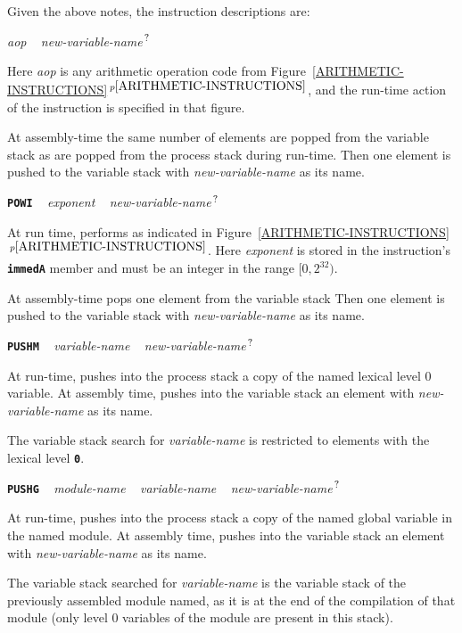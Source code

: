\documentclass[12pt]{article}
\makeatletter
\newcommand{\TT}[1]{{\tt \bfseries #1}}
\newcommand{\QMARK}{{$^{\,\mbox{\footnotesize ?}}$}}
\newcommand{\ttkey}[1]{\TT{#1}\index{#1@{\tt #1}}}
\newcommand{\itemref}[1]{\ref{#1}$\,^{p\pageref{#1}}$}
\newenvironment{indpar}[1][0.3in]%
	{\begin{list}{}%
		     {\setlength{\itemsep}{0in}%
		      \setlength{\topsep}{0in}%
		      \setlength{\parsep}{1ex}%
		      \setlength{\labelwidth}{#1}%
		      \setlength{\leftmargin}{#1}%
		      \addtolength{\leftmargin}{\labelsep}}%
	 \item}%
	{\end{list}}
\makeatother
\begin{document}

Given the above notes, the instruction descriptions are:

{\em aop} ~ {\em new-variable-name}\QMARK{}
\begin{indpar}
Here {\em aop} is any arithmetic operation code from
Figure~\itemref{ARITHMETIC-INSTRUCTIONS}, and the run-time
action of the instruction is specified in that figure.

At assembly-time the same number of elements are popped from the variable stack
as are popped from the process stack during run-time.
Then one element is pushed to the variable stack with
{\em new-variable-name} as its name.
\end{indpar}

\ttkey{POWI} ~ {\em exponent} ~
              {\em new-variable-name}\QMARK{}
\begin{indpar}
At run time, performs as indicated in
Figure~\itemref{ARITHMETIC-INSTRUCTIONS}.
Here {\em exponent} is stored in the instruction's \TT{immedA}
member and must be an integer in the range $[0,2^{32})$.

At assembly-time pops one element from the variable stack
Then one element is pushed to the variable stack with
{\em new-variable-name} as its name.
\end{indpar}

\ttkey{PUSHM} ~ {\em variable-name} ~
              {\em new-variable-name}\QMARK{}
\begin{indpar}
At run-time, pushes into the process stack a copy of the named
lexical level 0 variable.
At assembly time, pushes into the variable stack an
element with {\em new-variable-name} as its name.

The variable stack search for {\em variable-name} is restricted to
elements with the lexical level \TT{0}.
\end{indpar}

\ttkey{PUSHG} ~ {\em module-name} ~ {\em variable-name} ~
              {\em new-variable-name}\QMARK{}
\begin{indpar}
At run-time, pushes into the process stack a copy of the named
global variable in the named module.
At assembly time, pushes into the variable stack an
element with {\em new-variable-name} as its name.

The variable stack searched for {\em variable-name} is the variable
stack of the previously assembled module named, as it is at the
end of the compilation of that module (only level 0 variables
of the module are present in this stack).
\end{indpar}
\end{document}
